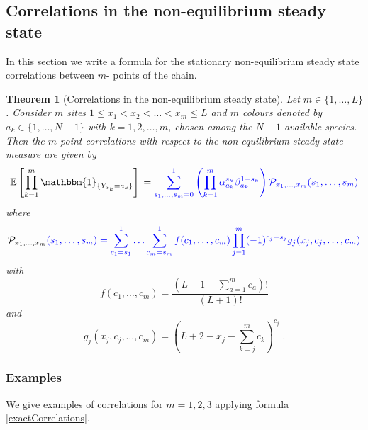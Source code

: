 \documentclass[10pt]{article}
\numberwithin{equation}{section}
\numberwithin{equation}{subsection}
\newtheorem{theorem}{Theorem}
\newcommand{\dt}{\;.}
\newcommand{\fra}[1]{\textcolor[rgb]{0,0,1}{#1}}
\begin{document}
\subsection{Correlations in the non-equilibrium steady state}\label{subsection-exact}
In this section we write a formula for the stationary non-equilibrium steady state correlations between $m$- points of the chain.
\begin{theorem}[Correlations in the non-equilibrium steady state]\label{thm-correlations}
Let $m\in \{1,\ldots,L\}$. Consider $m$ sites $1 \le x_{1} < x_2 < \ldots < x_m \le L $ and
{$m$ colours denoted by $a_{k}\in\{1,\ldots,N-1\}$  with $k=1,2,\ldots, m$, chosen among the $N-1$ available species.}  
Then the $m$-point correlations with respect to the non-equilibrium steady state measure are given by 
\begin{equation}\label{exactCorrelations}
\mathbb{E}\left[\prod_{k=1}^{m}\mathbbm{1}_{\{Y_{x_{k}}=a_{k}\}}\right]\\=\fra{\sum_{s_{1},\ldots,s_{m}=0}^{1}\left(\prod_{k=1}^{m}\alpha_{a_{k}}^{s_{k}}\beta_{a_{k}}^{1-s_{k}}\right)\mathcal{P}_{x_{1},\ldots,x_{m}}(s_{1},\ldots,s_{m})}
\end{equation}
where
\begin{equation}\label{abs-probabilities}
	\mathcal{P}_{x_{1},\ldots,x_{m}}\fra{(s_{1},\ldots,s_{m})=\sum_{c_{1}=s_{1}}^{1}\ldots\sum_{c_{m}=s_{m}}^{1}f(c_{1},\ldots,c_{m})\prod_{j=1}^{m}(-1)^{c_{j}-s_{j}}g_{j}(x_{j},c_{j},\ldots,c_{m})}
\end{equation}
with
\begin{equation}\label{powerCoeffNOspec}
	f(c_{1},\ldots,c_{m})=\frac{(L+1-\sum_{a=1}^{m}c_{a})!}{(L+1)!}
\end{equation}
and
\begin{equation}\label{powerCoeffSpecies}
	g_{j}(x_{j},c_{j},\ldots,c_{m})=\left(L+2-x_{j}-\sum_{k=j}^{m}c_{k}\right)^{c_{j}}\dt
\end{equation}
\end{theorem}

\subsubsection{Examples}
We give examples  of correlations for $m=1,2,3$ applying formula \eqref{exactCorrelations}.
\end{document}
